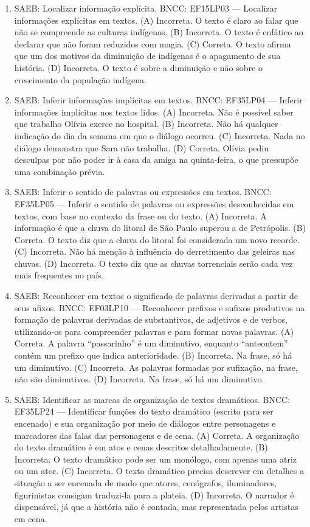 \begin{enumerate}
\item
SAEB: Localizar informação explícita. 
BNCC: EF15LP03 --- Localizar informações explícitas em textos.
(A) Incorreta. O texto é claro ao falar que não se compreende as culturas indígenas. 
(B) Incorreta. O texto é enfático ao declarar que não foram reduzidos com magia. 
(C) Correta. O texto afirma que um dos motivos da diminuição de indígenas é o apagamento de sua história. 
(D) Incorreta. O texto é sobre a diminuição e não sobre o crescimento da população indígena.

\item
SAEB: Inferir informações implícitas em textos. 
BNCC: EF35LP04 --- Inferir informações implícitas nos textos lidos. 
(A) Incorreta. Não é possível saber que trabalho Olívia exerce no hospital. 
(B) Incorreta. Não há qualquer indicação do dia da semana em que o diálogo ocorreu. 
(C) Incorreta. Nada no diálogo demonstra que Sara não trabalha. 
(D) Correta. Olívia pediu desculpas por não poder ir à casa da amiga na quinta-feira, o que pressupõe uma combinação prévia.

\item
SAEB: Inferir o sentido de palavras ou expressões em textos. 
BNCC: EF35LP05 --- Inferir o sentido de palavras ou expressões desconhecidas em textos, com base no contexto da frase ou do texto. 
(A) Incorreta. A informação é que a chuva do litoral de São Paulo superou a de Petrópolis. 
(B) Correta. O texto diz que a chuva do litoral foi considerada um novo recorde. 
(C) Incorreta. Não há menção à influência do derretimento das geleiras nas chuvas. 
(D) Incorreta. O texto diz que as chuvas torrenciais serão cada vez mais frequentes no país.

\item
SAEB: Reconhecer em textos o significado de palavras derivadas a partir de seus afixos. 
BNCC: EF03LP10 --- Reconhecer prefixos e sufixos produtivos na formação de palavras derivadas de substantivos, de adjetivos e de verbos, utilizando-os para compreender palavras e para formar novas palavras. 
(A) Correta. A palavra ``passarinho'' é um diminutivo, enquanto ``anteontem'' contém um prefixo que indica anterioridade. 
(B) Incorreta. Na frase, só há um diminutivo. 
(C) Incorreta. As palavras formadas por sufixação, na frase, não são diminutivos. 
(D) Incorreta. Na frase, só há um diminutivo.

\item
SAEB: Identificar as marcas de organização de textos dramáticos. 
BNCC: EF35LP24 --- Identificar funções do texto dramático (escrito para ser encenado) e sua organização por meio de diálogos entre personagens e marcadores das falas das personagens e de cena. 
(A) Correta. A organização do texto dramático é em atos e cenas descritos detalhadamente. 
(B) Incorreta. O texto dramático pode ser um monólogo, com apenas uma atriz ou um ator. 
(C) Incorreta. O texto dramático precisa descrever em detalhes a situação a ser encenada de modo que atores, cenógrafos, iluminadores, figurinistas consigam traduzi-la para a plateia. 
(D) Incorreta. O narrador é dispensável, já que a história não é contada, mas representada pelos artistas em cena.


\end{enumerate}
